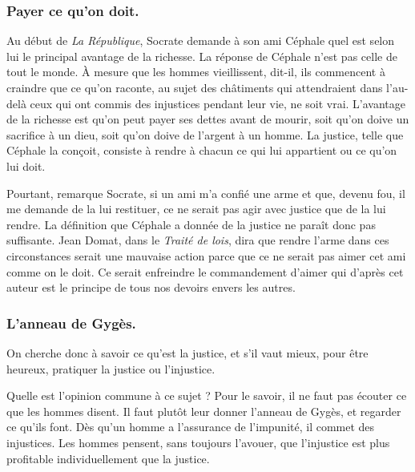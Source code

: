 \documentclass[fontsize=28pt,a4paper]{scrartcl}
\begin{document}

\subsubsection*{Payer ce qu'on doit.}

Au début de \textit{La République}, Socrate demande à son ami Céphale quel est selon lui le principal avantage de la richesse. La réponse de Céphale n'est pas celle de tout le monde. À mesure que les hommes vieillissent, dit-il, ils commencent à craindre que ce qu'on raconte, au sujet des châtiments qui attendraient dans l'au-delà ceux qui ont commis des injustices pendant leur vie, ne soit vrai. L'avantage de la richesse est qu'on peut payer ses dettes avant de mourir, soit qu'on doive un sacrifice à un dieu, soit qu'on doive de l'argent à un homme. La justice, telle que Céphale la conçoit, consiste à rendre à chacun ce qui lui appartient ou ce qu'on lui doit.

Pourtant, remarque Socrate, si un ami m'a confié une arme et que, devenu fou, il me demande de la lui restituer, ce ne serait pas agir avec justice que de la lui rendre. La définition que Céphale a donnée de la justice ne paraît donc pas suffisante. Jean Domat, dans le \textit{Traité de lois}, dira que rendre l'arme dans ces circonstances serait une mauvaise action parce que ce ne serait pas aimer cet ami comme on le doit. Ce serait enfreindre le commandement d'aimer qui d'après cet auteur est le principe de tous nos devoirs envers les autres.

\subsubsection*{L'anneau de Gygès.}

On cherche donc à savoir ce qu'est la justice, et s'il vaut mieux, pour être heureux, pratiquer la justice ou l'injustice.

Quelle est l'opinion commune à ce sujet ? Pour le savoir, il ne faut pas écouter ce que les hommes disent. Il faut plutôt leur donner l'anneau de Gygès, et regarder ce qu'ils font. Dès qu'un homme a l'assurance de l'impunité, il commet des injustices. Les hommes pensent, sans toujours l'avouer, que l'injustice est plus profitable individuellement que la justice.
\end{document}
